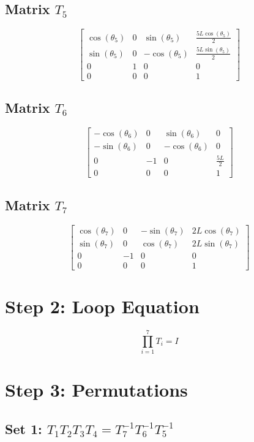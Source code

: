 \documentclass[12pt, a4paper]{article}
\begin{document}
\subsection*{Matrix $T_{5}$}
\[ \left[\begin{matrix}\cos{\left(\theta_{5} \right)} & 0 & \sin{\left(\theta_{5} \right)} & \frac{5 L \cos{\left(\theta_{5} \right)}}{2}\\\sin{\left(\theta_{5} \right)} & 0 & - \cos{\left(\theta_{5} \right)} & \frac{5 L \sin{\left(\theta_{5} \right)}}{2}\\0 & 1 & 0 & 0\\0 & 0 & 0 & 1\end{matrix}\right] \]
\subsection*{Matrix $T_{6}$}
\[ \left[\begin{matrix}- \cos{\left(\theta_{6} \right)} & 0 & \sin{\left(\theta_{6} \right)} & 0\\- \sin{\left(\theta_{6} \right)} & 0 & - \cos{\left(\theta_{6} \right)} & 0\\0 & -1 & 0 & \frac{5 L}{2}\\0 & 0 & 0 & 1\end{matrix}\right] \]
\subsection*{Matrix $T_{7}$}
\[ \left[\begin{matrix}\cos{\left(\theta_{7} \right)} & 0 & - \sin{\left(\theta_{7} \right)} & 2 L \cos{\left(\theta_{7} \right)}\\\sin{\left(\theta_{7} \right)} & 0 & \cos{\left(\theta_{7} \right)} & 2 L \sin{\left(\theta_{7} \right)}\\0 & -1 & 0 & 0\\0 & 0 & 0 & 1\end{matrix}\right] \]


\section{Step 2: Loop Equation}
\[ \prod_{i=1}^{7} T_i = I \]

\section{Step 3: Permutations}
\subsection*{Set 1: $T_{1}T_{2}T_{3}T_{4} = T_{7}^{-1}T_{6}^{-1}T_{5}^{-1}$}
\end{document}
